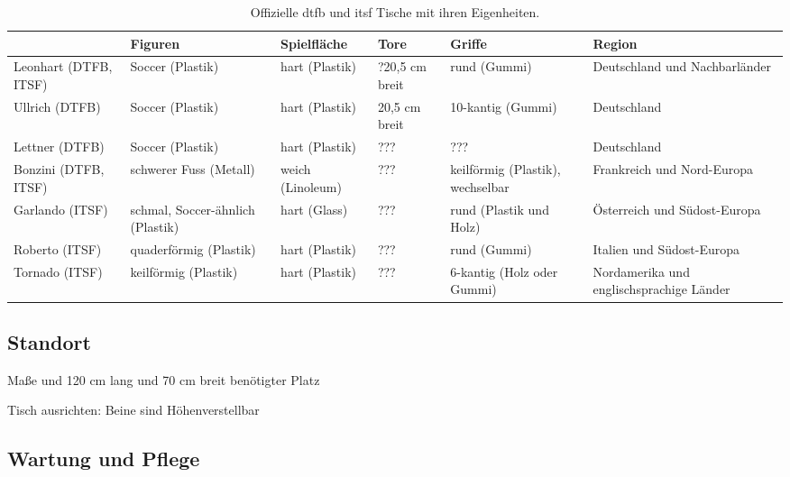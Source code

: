 {\small
\begin{center} 
\begin{table} 
\begin{tabular}{ p{1.5cm}||p{2cm}|p{2cm}|p{2cm}|p{2cm}|p{2cm}} 
 	& Figuren & Spielfläche & Tore & Griffe & Region \\ 
\hline 
\hline 
Leonhart (DTFB, ITSF) & Soccer (Plastik) & hart (Plastik) & ?20,5 cm breit & rund (Gummi) & Deutschland und Nachbarländer \\ 
\hline 
Ullrich  (DTFB) &  Soccer (Plastik) &  hart (Plastik) & 20,5 cm breit & 10-kantig (Gummi) & Deutschland \\ 
\hline 
Lettner (DTFB)  & Soccer (Plastik)  &  hart (Plastik) & ??? & ??? & Deutschland \\ 
\hline 
Bonzini (DTFB, ITSF)  & schwerer Fuss (Metall) & weich (Linoleum) & ??? & keilförmig (Plastik), wechselbar & Frankreich und Nord-Europa \\ 
\hline 
Garlando (ITSF)  & schmal, Soccer-ähnlich (Plastik) &  hart (Glass) & ??? & rund (Plastik und Holz) & Österreich und Südost-Europa \\ 
\hline 
Roberto (ITSF) & quaderförmig (Plastik) &  hart (Plastik) & ??? & rund (Gummi) & Italien und Südost-Europa \\ 
\hline 
Tornado (ITSF)  & keilförmig (Plastik) &  hart (Plastik) & ??? & 6-kantig (Holz oder Gummi) & Nordamerika und englischsprachige Länder \\ 
\end{tabular} 
\caption{Offizielle \gls{dtfb} und \gls{itsf} Tische mit ihren Eigenheiten.}
\label{tab:tische}
\end{table} 
\end{center}
}



\subsection{Standort}
\label{tisch:tisch:standort}

Maße und 120 cm lang und 70 cm breit benötigter Platz

Tisch ausrichten: Beine sind Höhenverstellbar

\subsection{Wartung und Pflege}
\label{tisch:tisch:wartung}


